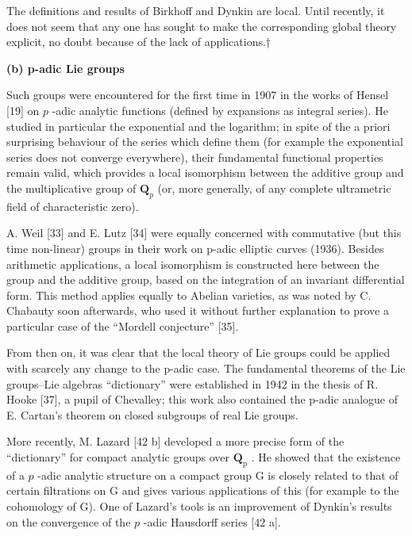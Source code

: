 The definitions and results of Birkhoff and Dynkin are local. Until recently, it does not seem that any one has sought to make the corresponding global theory explicit, no doubt because of the lack of applications.†

\textbf{(b) p-adic Lie groups}

Such groups were encountered for the first time in 1907 in the works of Hensel {[}19{]} on \(p\) -adic analytic functions (defined by expansions as integral series). He studied in particular the exponential and the logarithm; in spite of the a priori surprising behaviour of the series which define them (for example the exponential series does not converge everywhere), their fundamental functional properties remain valid, which provides a local isomorphism between the additive group and the multiplicative group of \(\mathbf{Q}_p\) (or, more generally, of any complete ultrametric field of characteristic zero).

A. Weil {[}33{]} and E. Lutz {[}34{]} were equally concerned with commutative (but this time non-linear) groups in their work on p-adic elliptic curves (1936). Besides arithmetic applications, a local isomorphism is constructed here between the group and the additive group, based on the integration of an invariant differential form. This method applies equally to Abelian varieties, as was noted by C. Chabauty soon afterwards, who used it without further explanation to prove a particular case of the ``Mordell conjecture'' {[}35{]}.

From then on, it was clear that the local theory of Lie groups could be applied with scarcely any change to the p-adic case. The fundamental theorems of the Lie groups--Lie algebras ``dictionary'' were established in 1942 in the thesis of R. Hooke {[}37{]}, a pupil of Chevalley; this work also contained the p-adic analogue of E. Cartan's theorem on closed subgroups of real Lie groups.

More recently, M. Lazard {[}42 b{]} developed a more precise form of the ``dictionary'' for compact analytic groups over \(\mathbf{Q}_{\mathrm{p}}\) . He showed that the existence of a \(p\) -adic analytic structure on a compact group G is closely related to that of certain filtrations on G and gives various applications of this (for example to the cohomology of G). One of Lazard's tools is an improvement of Dynkin's results on the convergence of the \(p\) -adic Hausdorff series {[}42 a{]}.


